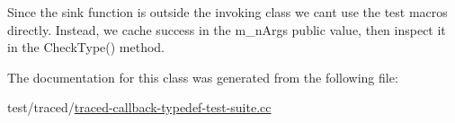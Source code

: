Since the sink function is outside the invoking class we can\textquotesingle{}t use the test macros directly. Instead, we cache success in the {\ttfamily m\+\_\+n\+Args} public value, then inspect it in the Check\+Type() method. 

The documentation for this class was generated from the following file\+:\begin{DoxyCompactItemize}
\item 
test/traced/\hyperlink{traced-callback-typedef-test-suite_8cc}{traced-\/callback-\/typedef-\/test-\/suite.\+cc}\end{DoxyCompactItemize}
